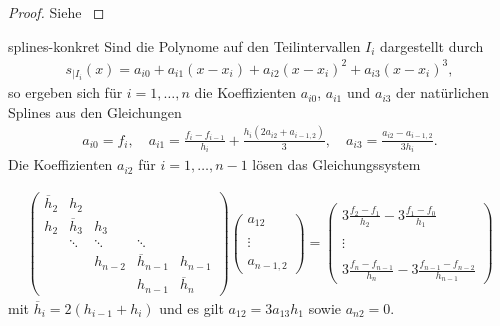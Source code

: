 \begin{proof}
  Siehe \cite[Satz 2.9]{Rannacher17}
\end{proof}

\begin{Lemma}{splines-konkret}
  Sind die Polynome auf den Teilintervallen $I_i$ dargestellt durch
  \begin{gather}
    s_{|I_i}(x) = a_{i0} + a_{i1} (x-x_i) + a_{i2}(x-x_i)^2 + a_{i3}(x-x_i)^3,
  \end{gather}
  so ergeben sich für $i=1,\dots,n$ die Koeffizienten $a_{i0}$,
  $a_{i1}$ und $a_{i3}$ der natürlichen Splines aus den Gleichungen
  \begin{gather}
    a_{i0} = f_i,
    \quad a_{i1} = \tfrac{f_i-f_{i-1}}{h_i}
    + \tfrac{h_i(2 a_{i2} + a_{i-1,2})}{3} ,
    \quad a_{i3} = \tfrac{a_{i2} - a_{i-1,2}}{3h_i}.
  \end{gather}
  Die Koeffizienten $a_{i2}$ für $i=1,\dots,n-1$ lösen das Gleichungssystem
  
  \begin{gather}
    \begin{pmatrix}
      \overline{h}_2 & h_2\\
      h_2 & \overline{h}_3 & h_3\\
      & \ddots& \ddots& \ddots\\
      &&h_{n-2} & \overline{h}_{n-1} & h_{n-1}\\
      &&&h_{n-1} & \overline{h}_n
    \end{pmatrix}
    \begin{pmatrix}
      a_{12}\\\\\vdots\\\\a_{n-1,2}
    \end{pmatrix}
    =
    \begin{pmatrix}
      3\tfrac{f_2-f_1}{h_2} - 3\tfrac{f_1-f_0}{h_1}
      \\\\\vdots\\\\
      3\tfrac{f_{n}-f_{n-1}}{h_n} - 3\tfrac{f_{n-1}-f_{n-2}}{h_{n-1}}
    \end{pmatrix}
  \end{gather}
  mit $\overline{h}_i = 2 (h_{i-1}+h_i)$ und es gilt
  $a_{12} = 3a_{13}h_1$ sowie $a_{n2}=0$.
\end{Lemma}

